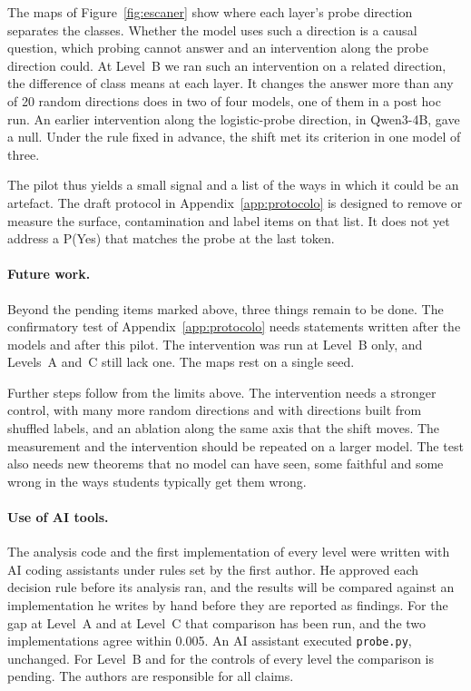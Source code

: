 \documentclass[10pt]{article}
\newcommand{\vr}[1]{\texttt{#1}}
\begin{document}
The maps of Figure~\ref{fig:escaner} show where each layer's probe direction separates the classes. Whether the model uses such a direction is a causal question, which
probing cannot answer and an intervention along the probe direction could.
At Level~B we ran such an intervention on a related direction, the difference of class means at each layer. It changes
the answer more than any of 20 random directions does in two of four models, one of them in a post hoc run.
An earlier intervention along the logistic-probe direction, in Qwen3-4B, gave a null.
Under the rule fixed in advance, the shift met its criterion in one model of three.

The pilot thus yields a small signal and a list of the ways in which it could be an artefact. The draft protocol in
Appendix~\ref{app:protocolo} is designed to remove or measure the surface, contamination and label items on that
list. It does not yet address a P(Yes) that matches the probe at the last token.

\paragraph{Future work.}
Beyond the pending items marked above, three things remain to be done. The confirmatory test of Appendix~\ref{app:protocolo} needs statements written after
the models and after this pilot. The intervention was run at Level~B only, and Levels~A and~C still lack one. The maps
rest on a single seed.

Further steps follow from the limits above. The intervention needs a stronger control, with many more random
directions and with directions built from shuffled labels, and an ablation along the same axis that the shift moves.
The measurement and the intervention should be repeated on a larger model. The test also needs new theorems that no
model can have seen, some faithful and some wrong in the ways students typically get them wrong.

\paragraph{Use of AI tools.}
The analysis code and the first implementation of every level were written with AI coding assistants under rules
set by the first author. He approved each decision rule before its analysis ran, and the results will be compared
against an implementation he writes by hand before they are reported as findings. For the gap at Level~A and at
Level~C that comparison has been run, and the two implementations agree within 0.005. An AI assistant executed
\vr{probe.py}, unchanged. For Level~B and for the controls of every level the comparison is pending. The
authors are responsible for all claims.
\end{document}
